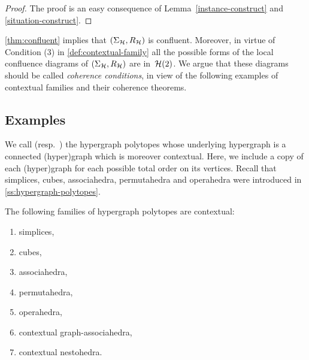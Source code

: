 \begin{proof} 
  The proof is an easy consequence of Lemma~\ref{instance-construct} and \cref{situation-construct}. 
\end{proof}

\cref{thm:confluent} implies that $(\Sigma_{\mathcal{H}},R_{\mathcal{H}})$ is confluent.
Moreover, in virtue of Condition (3) in \cref{def:contextual-family} all the possible forms of the local confluence diagrams of $(\Sigma_{\mathcal{H}},R_{\mathcal{H}})$ are in~$\mathcal{H}(2)$.
We argue that these diagrams should be called \emph{coherence conditions}, in view of the following examples of contextual families and their coherence theorems. 


\subsection{Examples}
\label{ss:examples}

We call  (resp.\ ) the hypergraph polytopes whose underlying hypergraph is a connected (hyper)graph which is moreover contextual.
Here, we include a copy of each (hyper)graph for each possible total order on its vertices.
Recall that simplices, cubes, associahedra, permutahedra and operahedra were introduced in \cref{ss:hypergraph-polytopes}.

\begin{samepage}
  \begin{thm}
    \label{thm:examples}
    The following families of hypergraph polytopes are contextual:
    \begin{enumerate}[label=(\alph*)]
      \item simplices,
      \item cubes,
      \item associahedra,
      \item permutahedra,
      \item operahedra,
      \item contextual graph-associahedra,
      \item contextual nestohedra.
    \end{enumerate}
  \end{thm}
\end{samepage}

